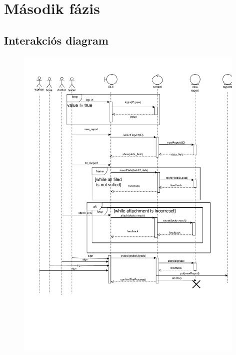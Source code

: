 \chapter{Második fázis}\label{sect:SecondPhase}

\section{Interakciós diagram}

\begin{figure}[!h]
	\centering
	\includegraphics[trim = 10mm 10mm 0mm 10mm,clip,width=110mm, keepaspectratio]{figures/interaction_diagram.pdf}
\end{figure}